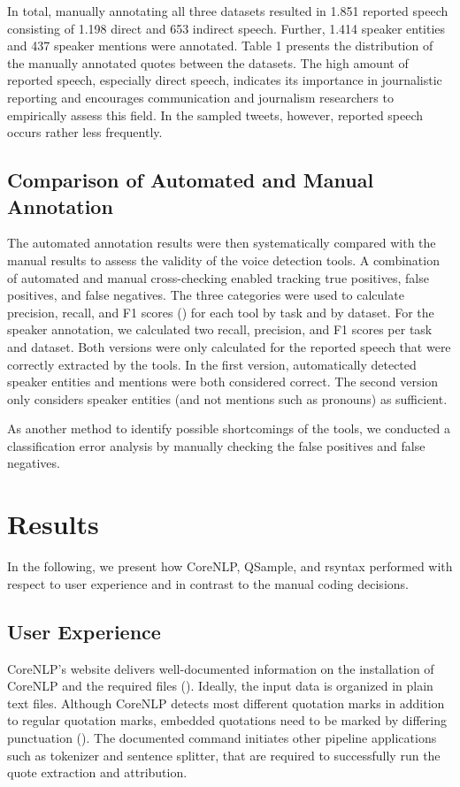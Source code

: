\documentclass{ccr}
\begin{document}

In total, manually annotating all three datasets resulted in 1.851
reported speech consisting of 1.198 direct and 653 indirect speech. Further, 1.414 speaker entities and 437 speaker mentions were annotated.
Table 1 presents the distribution of the manually annotated
quotes between the datasets. The high amount of reported speech,
especially direct speech, indicates its importance in journalistic
reporting and encourages communication and journalism researchers to
empirically assess this field. In the sampled tweets, however, reported
speech occurs rather less frequently.

\subsection{Comparison of Automated and Manual Annotation} The automated annotation results were then systematically compared with the manual results to assess the validity of the voice detection tools.
A combination of automated and manual cross-checking enabled tracking
true positives, false positives, and false negatives. The three
categories were used to calculate precision, recall, and F1 scores
(\cite{goutte2005probabilistic}) for each tool by task and by dataset. For
the speaker annotation, we calculated two recall, precision, and F1
scores per task and dataset. Both versions were only calculated for the
reported speech that were correctly extracted by the tools. In the first
version, automatically detected speaker entities and mentions were both
considered correct. The second version only considers speaker entities
(and not mentions such as pronouns) as sufficient.

As another method to identify possible shortcomings of the tools, we conducted a classification error analysis by manually checking the false positives and false negatives.

\section{Results}
In the following, we present how CoreNLP, QSample, and rsyntax performed
with respect to user experience and in contrast to the manual coding
decisions.

\subsection{User Experience}CoreNLP's website delivers well-documented information on the installation of CoreNLP and the required files (\cite{manning2014stanford}). Ideally, the input data is organized in plain text files. Although CoreNLP detects most different quotation marks in addition to regular quotation marks, embedded quotations need to be marked by differing punctuation (\cite{manning2014stanford}). The documented command initiates other pipeline applications such as tokenizer and sentence splitter, that are required to successfully run the quote extraction and attribution.
\end{document}
